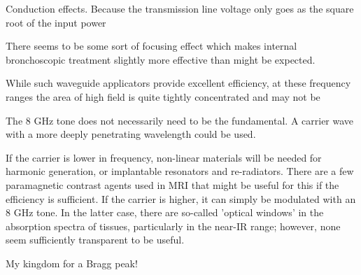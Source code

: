 \documentclass[paper.tex]{subfiles}
\begin{document}
Conduction effects. Because the transmission line voltage only goes as the square root of the input power

There seems to be some sort of focusing effect which makes internal bronchoscopic treatment slightly more effective than might be expected.


While such waveguide applicators provide excellent efficiency, at these frequency ranges the area of high field is quite tightly concentrated and may not be 



The 8 GHz tone does not necessarily need to be the fundamental. A carrier wave with a more deeply penetrating wavelength could be used. 

If the carrier is lower in frequency, non-linear materials\cite{Theory1973} will be needed for harmonic generation, or implantable resonators and re-radiators. There are a few paramagnetic contrast agents used in MRI that might be useful for this if the efficiency is sufficient. If the carrier is higher, it can simply be modulated with an 8 GHz tone. In the latter case, there are so-called 'optical windows' in the absorption spectra of tissues, particularly in the near-IR range; however, none seem sufficiently transparent to be useful.

My kingdom for a Bragg peak!




\clearpage
\printbibliography[heading=none, title={}, keyword={standards}]
\end{document}
